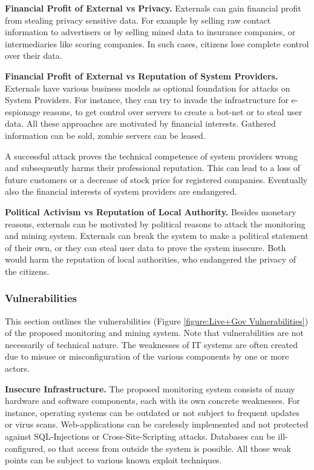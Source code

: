 \textbf{Financial Profit of External vs Privacy.}
Externals can gain financial profit from stealing privacy sensitive data.
For example by selling raw contact information to advertisers or by selling mined data to insurance companies, or intermediaries like scoring companies.
In such cases, citizens lose complete control over their data.

\textbf{Financial Profit of External vs Reputation of System Providers.}
Externals have various business models as optional foundation for attacks on System Providers.
For instance, they can try to invade the infrastructure for e-espionage reasons, to get control over servers to create a bot-net or to steal user data.
All these approaches are motivated by financial interests.
Gathered information can be sold, zombie servers can be leased.

A successful attack proves the technical competence of system providers wrong and subsequently harms their professional reputation.
This can lead to a loss of future customers or a decrease of stock price for registered companies.
Eventually also the financial interests of system providers are endangered.

\textbf{Political Activism vs Reputation of Local Authority.}
Besides monetary reasons, externals can be motivated by political reasons to attack the monitoring and mining system.
Externals can break the system to make a political statement of their own,
or they can steal user data to prove the system insecure.
Both would harm the reputation of local authorities, who endangered the privacy of the citizens.


\subsubsection{Vulnerabilities}
\label{subsubsection:Vulnerabilities}
This section outlines the vulnerabilities (Figure \ref{figure:Live+Gov Vulnerabilities}) of the proposed monitoring and mining system.
Note that vulnerabilities are not necessarily of technical nature.
The weaknesses of IT systems are often created due to misuse or misconfiguration of the various components by one or more actors.



\textbf{Insecure Infrastructure.}
The proposed monitoring system consists of many hardware and software components, each with its own concrete weaknesses.
For instance, operating systems can be outdated or not subject to frequent updates or virus scans.
Web-applications can be carelessly implemented and not protected against SQL-Injections or Cross-Site-Scripting attacks.
Databases can be ill-configured, so that access from outside the system is possible.
All those weak points can be subject to various known exploit techniques.

